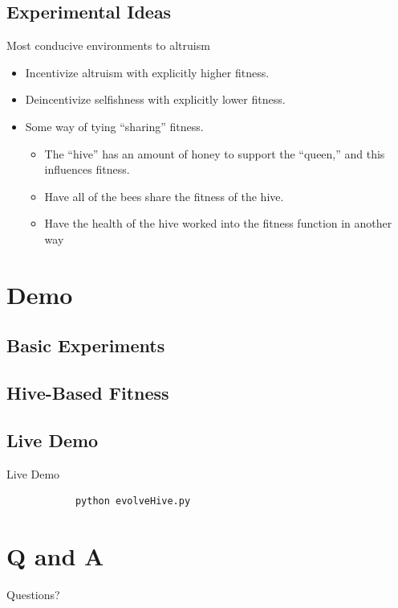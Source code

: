 \documentclass{beamer}
\begin{document}
	\subsection{Experimental Ideas}
	\begin{frame}{Most conducive environments to altruism}
		\begin{itemize}
			\item Incentivize altruism with explicitly higher fitness.
			\item Deincentivize selfishness with explicitly lower fitness.

			\item Some way of tying ``sharing'' fitness.
			\begin{itemize}
				\item The ``hive'' has an amount of honey to support the ``queen,'' and this influences fitness.
				\item Have all of the bees share the fitness of the hive.
				\item Have the health of the hive worked into the fitness function in another way
			\end{itemize}
		\end{itemize}
	\end{frame}


	\section{Demo}

	\subsection{Basic Experiments}

	\begin{frame}
		
	\end{frame}

	\subsection{Hive-Based Fitness}

	\begin{frame}
		
	\end{frame}


	\subsection{Live Demo}
	\begin{frame}[fragile]{Live Demo}
		\begin{verbatim}
			python evolveHive.py
		\end{verbatim}
	\end{frame}

	\section{Q and A}
	\begin{frame}{Questions?}
		\titlepage
	\end{frame}
\end{document}
